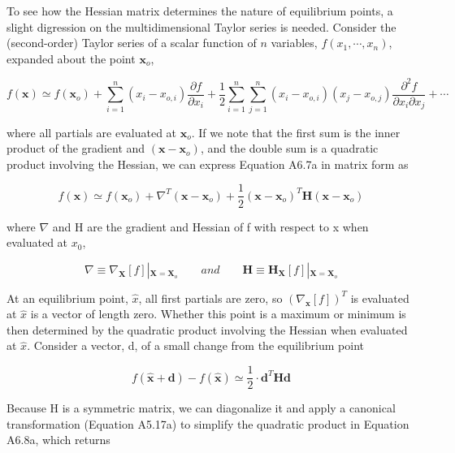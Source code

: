 \documentclass{article}
\begin{document}
To see how the Hessian matrix determines the nature of equilibrium points, a slight digression on the multidimensional Taylor series is needed. Consider the (second-order) Taylor series of a scalar function of $n$ variables, $f(x_1, \cdots, x_n)$, expanded about the point $\mathbf{x}_o$,

\begin{equation}
f(\mathbf{x})\simeq f(\mathbf{x}_{o})+\sum_{i=1}^{n}(x_{i}-x_{o,i})\frac{\partial f}{\partial x_{i}}+\frac{1}{2}\sum_{i=1}^{n}\sum_{j=1}^{n}(x_{i}-x_{o,i})(x_{j}-x_{o,j})\frac{\partial^{2}f}{\partial x_{i}\partial x_{j}}+\cdots
\end{equation}

where all partials are evaluated at  $ \mathbf{x}_o $. If we note that the first sum is the inner product of the gradient and  $ (\mathbf{x} - \mathbf{x}_o) $, and the double sum is a quadratic product involving the Hessian, we can express Equation A6.7a in matrix form as

\begin{equation}
f(\mathbf{x})\simeq f(\mathbf{x}_{o})+\nabla^{T}(\mathbf{x}-\mathbf{x}_{o})+\frac{1}{2}(\mathbf{x}-\mathbf{x}_{o})^{T}\mathbf{H}(\mathbf{x}-\mathbf{x}_{o})
\end{equation}

where  $ \nabla $ and H are the gradient and Hessian of f with respect to x when evaluated at  $ x_{0} $,

\begin{equation}
\nabla\equiv\nabla_{\mathbf{X}}[f]\left|_{\mathbf{X}=\mathbf{X}_{o}}\right.\qquad and\qquad\mathbf{H}\equiv\mathbf{H}_{\mathbf{X}}[f]\left|_{\mathbf{X}=\mathbf{X}_{o}}\right.
\end{equation}

At an equilibrium point,  $ \hat{x} $, all first partials are zero, so  $ (\nabla_{\mathbf{x}}[f])^{T} $ is evaluated at  $ \hat{x} $ is a vector of length zero. Whether this point is a maximum or minimum is then determined by the quadratic product involving the Hessian when evaluated at  $ \hat{x} $. Consider a vector, d, of a small change from the equilibrium point

\begin{equation}
f(\hat{\mathbf{x}}+\mathbf{d})-f(\hat{\mathbf{x}})\simeq\frac{1}{2}\cdot\mathbf{d}^{T}\mathbf{H}\mathbf{d}
\end{equation}

Because H is a symmetric matrix, we can diagonalize it and apply a canonical transformation (Equation A5.17a) to simplify the quadratic product in Equation A6.8a, which returns
\end{document}
